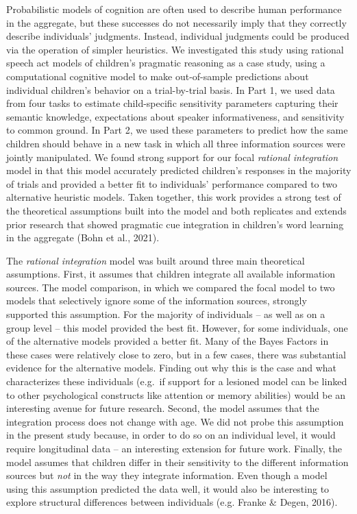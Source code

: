 \documentclass[
  man,floatsintext]{apa6}
\begin{document}
Probabilistic models of cognition are often used to describe human performance in the aggregate, but these successes do not necessarily imply that they correctly describe individuals' judgments. Instead, individual judgments could be produced via the operation of simpler heuristics. We investigated this study using rational speech act models of children's pragmatic reasoning as a case study, using a computational cognitive model to make out-of-sample predictions about individual children's behavior on a trial-by-trial basis. In Part 1, we used data from four tasks to estimate child-specific sensitivity parameters capturing their semantic knowledge, expectations about speaker informativeness, and sensitivity to common ground. In Part 2, we used these parameters to predict how the same children should behave in a new task in which all three information sources were jointly manipulated. We found strong support for our focal \emph{rational integration} model in that this model accurately predicted children's responses in the majority of trials and provided a better fit to individuals' performance compared to two alternative heuristic models. Taken together, this work provides a strong test of the theoretical assumptions built into the model and both replicates and extends prior research that showed pragmatic cue integration in children's word learning in the aggregate (Bohn et al., 2021).

The \emph{rational integration} model was built around three main theoretical assumptions. First, it assumes that children integrate all available information sources. The model comparison, in which we compared the focal model to two models that selectively ignore some of the information sources, strongly supported this assumption. For the majority of individuals -- as well as on a group level -- this model provided the best fit. However, for some individuals, one of the alternative models provided a better fit. Many of the Bayes Factors in these cases were relatively close to zero, but in a few cases, there was substantial evidence for the alternative models. Finding out why this is the case and what characterizes these individuals (e.g.~if support for a lesioned model can be linked to other psychological constructs like attention or memory abilities) would be an interesting avenue for future research. Second, the model assumes that the integration process does not change with age. We did not probe this assumption in the present study because, in order to do so on an individual level, it would require longitudinal data -- an interesting extension for future work. Finally, the model assumes that children differ in their sensitivity to the different information sources but \emph{not} in the way they integrate information. Even though a model using this assumption predicted the data well, it would also be interesting to explore structural differences between individuals (e.g. Franke \& Degen, 2016).
\end{document}

